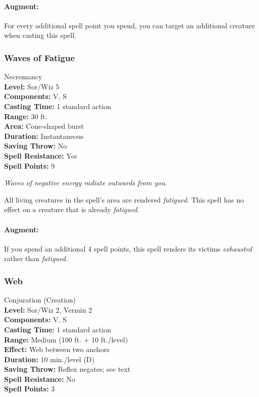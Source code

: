 \paragraph{Augment:} For every additional spell point you spend, you can target an additional creature when casting this spell.
\subsubsection{Waves of Fatigue}
\label{Spell:WavesOfFatigue}
Necromancy
\\ \textbf{Level:} Sor/Wiz 5
\\ \textbf{Components:} V, S
\\ \textbf{Casting Time:} 1 standard action
\\ \textbf{Range:} 30 ft.
\\ \textbf{Area:} Cone-shaped burst
\\ \textbf{Duration:} Instantaneous
\\ \textbf{Saving Throw:} No
\\ \textbf{Spell Resistance:} Yes
\\ \textbf{Spell Points:} 9

\emph{Waves of negative energy radiate outwards from you.}

All living creatures in the spell's area are rendered \emph{fatigued}. This spell has no effect on a creature that is already \emph{fatigued}.

\paragraph{Augment:} If you spend an additional 4 spell points, this spell renders its victims \emph{exhausted} rather than \emph{fatigued}.
\subsubsection{Web}
\label{Spell:Web}
Conjuration (Creation)
\\ \textbf{Level:} Sor/Wiz 2, Vermin 2
\\ \textbf{Components:} V, S
\\ \textbf{Casting Time:} 1 standard action
\\ \textbf{Range:} Medium (100 ft. + 10 ft./level)
\\ \textbf{Effect:} Web between two anchors
\\ \textbf{Duration:} 10 min./level (D)
\\ \textbf{Saving Throw:} Reflex negates; see text
\\ \textbf{Spell Resistance:} No
\\ \textbf{Spell Points:} 3

